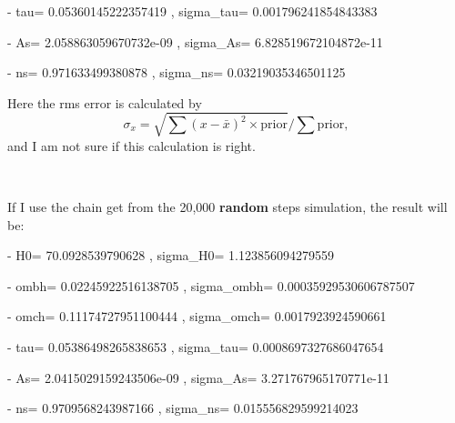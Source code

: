 \documentclass[showpacs, oneside, onecolumn, prl, amsmath, amssymb, nofootinbib, superscriptaddress, notitlepage]{revtex4-1}
\begin{document}
- tau= 0.05360145222357419 , 	sigma\_tau= 0.001796241854843383

- As= 2.058863059670732e-09 , 	sigma\_As= 6.828519672104872e-11

- ns= 0.971633499380878 , 	    sigma\_ns= 0.03219035346501125

Here the rms error is calculated by 
$$\sigma_x=\sqrt{\sum(x-\bar x)^2\times\text{prior}} / \sum \text{prior},$$
and I am not sure if this calculation is right.


~~~~

If I use the chain get from the 20,000 \textbf{random} steps simulation, the result will be:

- H0= 70.0928539790628 ,		sigma\_H0= 1.123856094279559

- ombh= 0.02245922516138705 ,	sigma\_ombh= 0.00035929530606787507

- omch= 0.11174727951100444 ,	sigma\_omch= 0.0017923924590661

- tau= 0.05386498265838653 ,	sigma\_tau= 0.0008697327686047654

- As= 2.0415029159243506e-09 ,	sigma\_As= 3.271767965170771e-11

- ns= 0.9709568243987166 ,		sigma\_ns= 0.015556829599214023
\end{document}
